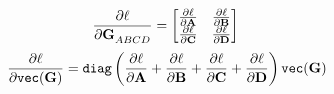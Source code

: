 \documentclass[journal,onecolumn]{IEEEtran}
\newcommand{\vtt}[1]{%
  \text{\normalfont\ttfamily\detokenize{#1}}%
}
\begin{document}
    $$ %
        \frac{\partial \ell}{\partial \mathbf{G}^{}_{ABCD}} = \begin{bmatrix}
             \frac{\partial \ell}{\partial \mathbf{A}} & \frac{\partial \ell}{\partial \mathbf{B}} \\
             \frac{\partial \ell}{\partial \mathbf{C}} & \frac{\partial \ell}{\partial \mathbf{D}}
        \end{bmatrix} \\
    $$
    $$
        \frac{\partial \ell}{\partial \vtt{vec}(\mathbf{G})}
        = \vtt{diag} \left( \frac{\partial \ell}{\partial \mathbf{A}} + \frac{\partial \ell}{\partial \mathbf{B}} + \frac{\partial \ell}{\partial \mathbf{C}} + \frac{\partial \ell}{\partial \mathbf{D}} \right) \vtt{vec}(\mathbf{G})
    $$ %

\\

\end{document}
